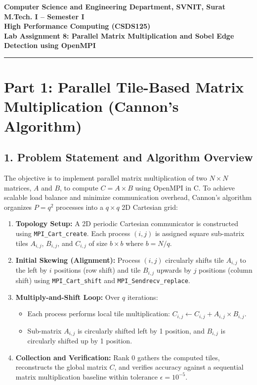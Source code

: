 \documentclass[12pt]{article}
\begin{document}
\begin{center}
\textbf{Computer Science and Engineering Department, SVNIT, Surat}\\
\textbf{M.Tech. I -- Semester I}\\
\textbf{High Performance Computing (CSDS125)}\\
\textbf{Lab Assignment 8: Parallel Matrix Multiplication and Sobel Edge Detection using OpenMPI}
\end{center}
\vspace{-4pt}
\hrule
\vspace{6pt}

\section*{Part 1: Parallel Tile-Based Matrix Multiplication (Cannon's Algorithm)}

\subsection*{1. Problem Statement and Algorithm Overview}
The objective is to implement parallel matrix multiplication of two $N \times N$ matrices, $A$ and $B$, to compute $C = A \times B$ using OpenMPI in C. To achieve scalable load balance and minimize communication overhead, Cannon's algorithm organizes $P = q^2$ processes into a $q \times q$ 2D Cartesian grid:
\begin{enumerate}
    \item \textbf{Topology Setup:} A 2D periodic Cartesian communicator is constructed using \texttt{MPI\_Cart\_create}. Each process $(i, j)$ is assigned square sub-matrix tiles $A_{i,j}$, $B_{i,j}$, and $C_{i,j}$ of size $b \times b$ where $b = N / q$.
    \item \textbf{Initial Skewing (Alignment):} Process $(i, j)$ circularly shifts tile $A_{i,j}$ to the left by $i$ positions (row shift) and tile $B_{i,j}$ upwards by $j$ positions (column shift) using \texttt{MPI\_Cart\_shift} and \texttt{MPI\_Sendrecv\_replace}.
    \item \textbf{Multiply-and-Shift Loop:} Over $q$ iterations:
    \begin{itemize}
        \item Each process performs local tile multiplication: $C_{i,j} \leftarrow C_{i,j} + A_{i,j} \times B_{i,j}$.
        \item Sub-matrix $A_{i,j}$ is circularly shifted left by 1 position, and $B_{i,j}$ is circularly shifted up by 1 position.
    \end{itemize}
    \item \textbf{Collection and Verification:} Rank 0 gathers the computed tiles, reconstructs the global matrix $C$, and verifies accuracy against a sequential matrix multiplication baseline within tolerance $\epsilon = 10^{-5}$.
\end{enumerate}
\end{document}

